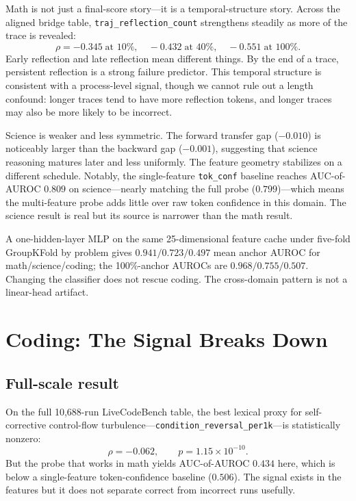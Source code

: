 \documentclass[10pt,twocolumn]{article}
\begin{document}
Math is not just a final-score story---it is a temporal-structure story. Across the aligned bridge table, \texttt{traj\_reflection\_count} strengthens steadily as more of the trace is revealed:
\[
\rho = -0.345\;\text{at 10\%},\quad -0.432\;\text{at 40\%},\quad -0.551\;\text{at 100\%.}
\]
Early reflection and late reflection mean different things. By the end of a trace, persistent reflection is a strong failure predictor. This temporal structure is consistent with a process-level signal, though we cannot rule out a length confound: longer traces tend to have more reflection tokens, and longer traces may also be more likely to be incorrect.

Science is weaker and less symmetric. The forward transfer gap ($-0.010$) is noticeably larger than the backward gap ($-0.001$), suggesting that science reasoning matures later and less uniformly. The feature geometry stabilizes on a different schedule. Notably, the single-feature \texttt{tok\_conf} baseline reaches AUC-of-AUROC $0.809$ on science---nearly matching the full probe ($0.799$)---which means the multi-feature probe adds little over raw token confidence in this domain. The science result is real but its source is narrower than the math result.

A one-hidden-layer MLP on the same 25-dimensional feature cache under five-fold GroupKFold by problem gives $0.941 / 0.723 / 0.497$ mean anchor AUROC for math/science/coding; the 100\%-anchor AUROCs are $0.968 / 0.755 / 0.507$. Changing the classifier does not rescue coding. The cross-domain pattern is not a linear-head artifact.

\section{Coding: The Signal Breaks Down}
\label{sec:coding}

\subsection{Full-scale result}

On the full 10,688-run LiveCodeBench table, the best lexical proxy for self-corrective control-flow turbulence---\texttt{condition\_reversal\_per1k}---is statistically nonzero:
\[
\rho = -0.062,\qquad p = 1.15\times 10^{-10}.
\]
But the probe that works in math yields AUC-of-AUROC $0.434$ here, which is below a single-feature token-confidence baseline ($0.506$). The signal exists in the features but it does not separate correct from incorrect runs usefully.
\end{document}
